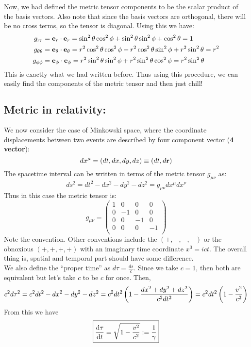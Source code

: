 Now, we had defined the metric tensor components to be the scalar product of the basis vectors. Also note that since the basis vectors are orthogonal, there will be no cross terms, so the tensor is diagonal. Using this we have:
\begin{align*}
    g_{rr} &= \boldsymbol{\mathbf{e}}_r\cdot \boldsymbol{\mathbf{e}}_r = \sin^2\theta \cos^2\phi + \sin^2\theta \sin^2\phi + \cos^2\theta = 1\\
    g_{\theta\theta} &= \boldsymbol{\mathbf{e}}_\theta\cdot \boldsymbol{\mathbf{e}}_\theta = r^2 \cos^2\theta \cos^2\phi + r^2 \cos^2\theta \sin^2\phi + r^2 \sin^2\theta = r^2\\
    g_{\phi\phi} &= \boldsymbol{\mathbf{e}}_\phi\cdot \boldsymbol{\mathbf{e}}_\phi = r^2 \sin^2\theta \sin^2\phi + r^2 \sin^2\theta \cos^2\phi = r^2 \sin^2\theta
\end{align*}
This is exactly what we had written before. Thus using this procedure, we can easily find the components of the metric tensor and then just chill! 
\subsection{Metric in relativity:}
We now consider the case of Minkowski space, where the coordinate displacements between two events are described by four component vector (\textbf{4 vector}):
$$dx^\mu = (dt, dx,dy,dz)\equiv (dt, d\boldsymbol{\mathbf{r}})$$
The spacetime interval can be written in terms of the metric tensor $g_{\mu\nu}$ as:
$$ds^2 = dt^2-dx^2-dy^2-dz^2= g_{\mu\nu} dx^\mu dx^\nu$$
Thus in this case the metric tensor is:
$$g_{\mu\nu} = \begin{pmatrix}
    1 & 0 & 0 & 0\\
     0 & -1 & 0 & 0\\
      0 & 0 & -1 & 0\\
       0 & 0 & 0 & -1\\
\end{pmatrix}$$
Note the convention. Other conventions include the $(+,-,-,-)$ or the obnoxious $(+,+,+,+)$ with an imaginary time coordinate $x^0=ict$. The overall thing is, spatial and temporal part should have some difference.\\[0.3cm] We also define the ``proper time'' as $d\tau = \frac{ds}{c}$. Since we take $c=1$, then both are equivalent but let's take $c$ to be $c$ for once. Then,
$$c^2 d\tau^2 = c^2dt^2-dx^2-dy^2-dz^2 = c^2dt^2\left( 1 - \frac{dx^2+dy^2+dz^2}{c^2dt^2} \right) = c^2dt^2\left( 1-\frac{v^2}{c^2} \right)$$
From this we have
$$\boxed{\dv{\tau}{t} = \sqrt{1- \frac{v^2}{c^2}}:=\frac{1}{\gamma}}$$

